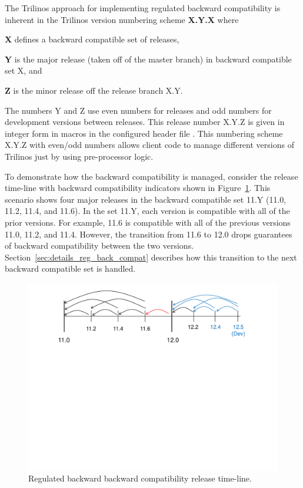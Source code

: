 \documentclass[11pt]{SANDreport}
\begin{document}
The Trilinos approach for implementing regulated backward
compatibility is inherent in the Trilinos version numbering scheme
{}\textbf{X.Y.X} where
%
\begin{compactitem}
%
{}\item\textbf{X} defines a backward compatible set of releases,
%
{}\item\textbf{Y} is the major release (taken off of the master
branch) in backward compatible set X, and
%
{}\item\textbf{Z} is the minor release off the release branch X.Y.
%
\end{compactitem}

The numbers Y and Z use even numbers for releases and odd numbers for
development versions between releases.  This release number X.Y.Z is
given in integer form in macros in the configured header file
{}.  This numbering scheme X.Y.Z with
even/odd numbers allows client code to manage different versions of
Trilinos just by using pre-processor logic.

To demonstrate how the backward compatibility is managed, consider the
release time-line with backward compatibility indicators shown in
Figure~\ref{fig:BackwardCompatibilityTimeline}.  This scenario shows
four major releases in the backward compatible set 11.Y (11.0, 11.2,
11.4, and 11.6).  In the set 11.Y, each version is compatible with all
of the prior versions.  For example, 11.6 is compatible with all of
the previous versions 11.0, 11.2, and 11.4.  However, the transition
from 11.6 to 12.0 drops guarantees of backward compatibility between
the two versions.  Section~\ref{sec:details_reg_back_compat} describes
how this transition to the next backward compatible set is handled.

\begin{figure}
\begin{center}
\includegraphics[trim = 1.0in 5.0in 1.0in 0.2in, scale=0.55]
{BackwardCompatibilityTimeline}
{}\caption{Regulated backward backward compatibility release time-line.}
\label{fig:BackwardCompatibilityTimeline}
\end{center}
\end{figure}
\end{document}
